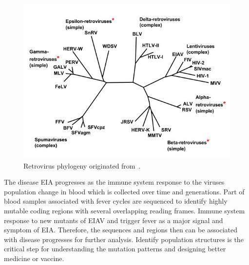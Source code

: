 \begin{figure}[h!tb]
\centering
 \includegraphics[width=5.5in]{pbdDEMO-include/pics/Phylogeny_of_Retroviruses}
\caption{Retrovirus phylogeny originated from~\citet{Weiss2006}.}
\label{fig:retrovirus}
\end{figure}

The disease EIA progresses as the immune system
response to the viruses population change in blood which is collected
over time and generations. Part of blood samples associated with fever cycles
are sequenced to identify highly mutable coding regions with several
overlapping reading frames. Immune system response to new mutants of EIAV and
trigger fever as a major signal and symptom of EIA. Therefore, the
sequences and regions then can be associated with disease progresses for
further analysis. Identify population structures is the critical step for
understanding the mutation patterns and designing better medicine or vaccine.

